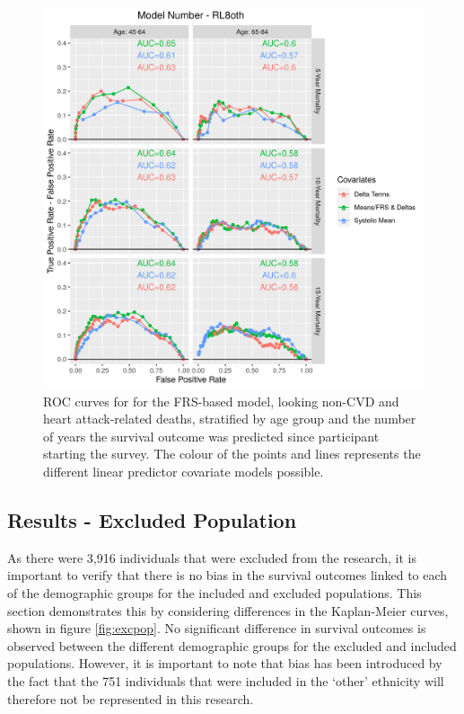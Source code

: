 \documentclass[
]{article}
\begin{document}
\begin{figure}
\hypertarget{fig:ROC_RL8oth}{%
\centering
\includegraphics{./Rmarkdown_Plots/ROC_CAx-Covariates_EventType_RL8oth.png}
\caption{ROC curves for for the FRS-based model, looking non-CVD and heart attack-related deaths, stratified by age group and the number of years the survival outcome was predicted since participant starting the survey. The colour of the points and lines represents the different linear predictor covariate models possible.}\label{fig:ROC_RL8oth}
}
\end{figure}

\hypertarget{results---excluded-population}{%
\subsection{Results - Excluded Population}\label{results---excluded-population}}

As there were 3,916 individuals that were excluded from the research, it is important to verify that there is no bias in the survival outcomes linked to each of the demographic groups for the included and excluded populations. This section demonstrates this by considering differences in the Kaplan-Meier curves, shown in figure \ref{fig:excpop}. No significant difference in survival outcomes is observed between the different demographic groups for the excluded and included populations. However, it is important to note that bias has been introduced by the fact that the 751 individuals that were included in the `other' ethnicity will therefore not be represented in this research.
\end{document}
